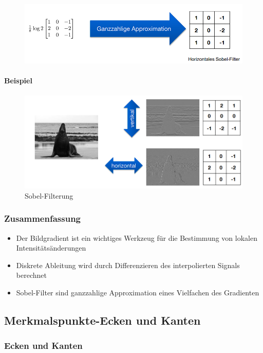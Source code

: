 \documentclass[12pt, a4paper, oneside]{article}
\begin{document}
\begin{figure}[htbp]
    \centering
    \includegraphics[scale=1]{../img/1-11.png}
    \label{img/1-11}
\end{figure}

\paragraph*{Beispiel}
\begin{figure}[htbp]
    \centering
    \includegraphics[scale=0.6]{../img/1-12.png}
    \caption{Sobel-Filterung}
    \label{img/1-12}
\end{figure}

\subsubsection{Zusammenfassung}
\begin{itemize}
    \item Der Bildgradient ist ein wichtiges Werkzeug für die Bestimmung von lokalen Intensitätsänderungen
    \item Diskrete Ableitung wird durch Differenzieren des interpolierten Signals berechnet
    \item Sobel-Filter sind ganzzahlige Approximation eines Vielfachen des Gradienten 
\end{itemize}

\subsection{Merkmalspunkte-Ecken und Kanten}
\subsubsection{Ecken und Kanten}
\end{document}
